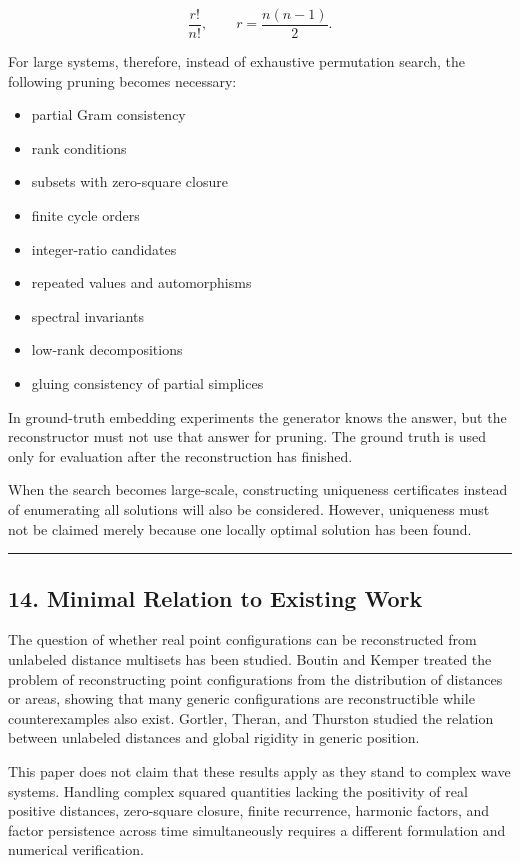 \documentclass[
  a4paper,
]{article}
\providecommand{\tightlist}{%
  \setlength{\itemsep}{0pt}\setlength{\parskip}{0pt}}
\begin{document}
\[
\frac{r!}{n!},
\qquad
r=\frac{n(n-1)}{2}.
\]

For large systems, therefore, instead of exhaustive permutation search,
the following pruning becomes necessary:

\begin{itemize}
\tightlist
\item
  partial Gram consistency
\item
  rank conditions
\item
  subsets with zero-square closure
\item
  finite cycle orders
\item
  integer-ratio candidates
\item
  repeated values and automorphisms
\item
  spectral invariants
\item
  low-rank decompositions
\item
  gluing consistency of partial simplices
\end{itemize}

In ground-truth embedding experiments the generator knows the answer,
but the reconstructor must not use that answer for pruning. The ground
truth is used only for evaluation after the reconstruction has finished.

When the search becomes large-scale, constructing uniqueness
certificates instead of enumerating all solutions will also be
considered. However, uniqueness must not be claimed merely because one
locally optimal solution has been found.

\begin{center}\rule{0.5\linewidth}{0.5pt}\end{center}

\subsection{14. Minimal Relation to Existing
Work}\label{minimal-relation-to-existing-work}

The question of whether real point configurations can be reconstructed
from unlabeled distance multisets has been studied. Boutin and Kemper
treated the problem of reconstructing point configurations from the
distribution of distances or areas, showing that many generic
configurations are reconstructible while counterexamples also exist.
Gortler, Theran, and Thurston studied the relation between unlabeled
distances and global rigidity in generic position.

This paper does not claim that these results apply as they stand to
complex wave systems. Handling complex squared quantities lacking the
positivity of real positive distances, zero-square closure, finite
recurrence, harmonic factors, and factor persistence across time
simultaneously requires a different formulation and numerical
verification.
\end{document}
